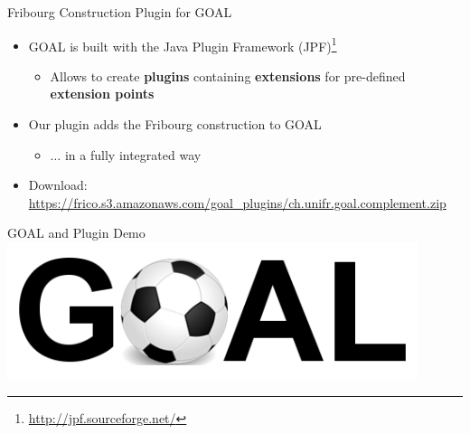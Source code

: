 \documentclass[12pt]{beamer}
\newcommand{\fat}[1]{\textbf{#1}}
\begin{document}
\begin{frame}{Fribourg Construction Plugin for GOAL}
\vspace{-0.1cm}
\begin{itemize}
\item GOAL is built with the Java Plugin Framework (JPF)\footnote{\url{http://jpf.sourceforge.net/}}
  \begin{itemize}
  \item Allows to create \fat{plugins} containing \fat{extensions} for pre-defined \fat{extension points}
  \end{itemize}
\pause
\item Our plugin adds the Fribourg construction to GOAL
  \begin{itemize}
  \item $\dots$ in a fully integrated way
  \end{itemize}
\end{itemize}
\centering
{}
\pause
\begin{itemize}
\item Download: \url{https://frico.s3.amazonaws.com/goal_plugins/ch.unifr.goal.complement.zip}
\end{itemize}
\end{frame}

\begin{frame}{GOAL and Plugin Demo}
\vspace{0.5cm}
\centering
\includegraphics[width=0.9\textwidth]{figures/goal_logo.png}
\end{frame}
\end{document}

